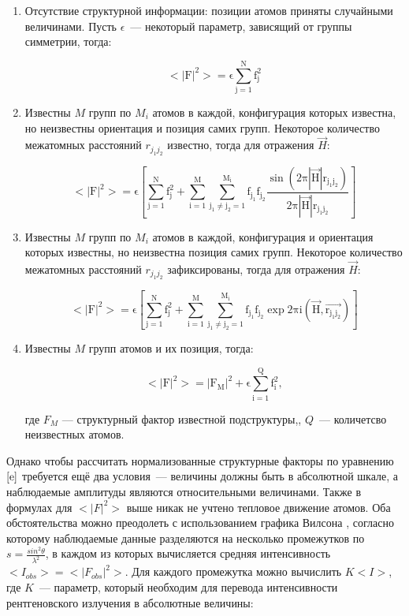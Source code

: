 \begin{enumerate}
	\item Отсутствие структурной информации: позиции атомов приняты случайными величинами. Пусть $\epsilon$~--- некоторый параметр, зависящий от группы симметрии, тогда:
	
	\begin{equation}\label{e1}
		\mathrm{<|F|^2> = \epsilon\sum\limits_{j=1}^N f_j^2}
	\end{equation}
	
	\item Известны $M$ групп по $M_i$ атомов в каждой, конфигурация которых известна, но неизвестны ориентация и позиция самих групп. Некоторое количество межатомных расстояний $r_{j_1j_2}$ известно, тогда для отражения $\overrightarrow{H}$:
	
	\begin{equation}\label{e2}
		\mathrm{<|F|^2> = \epsilon \left[\sum\limits_{j=1}^Nf_j^2 + \sum\limits_{i=1}^M\sum\limits_{j_1\neq j_2=1}^{M_i}f_{j_1}f_{j_2}\frac{\sin(2\pi |\overrightarrow{H}|r_{j_1j_2})}{2\pi |\overrightarrow{H}|r_{j_1j_2}}\right]}
	\end{equation}
	
	\item Известны $M$ групп по $M_i$ атомов в каждой, конфигурация и ориентация которых известны, но неизвестна позиция самих групп. Некоторое количество межатомных расстояний $r_{j_1j_2}$ зафиксированы, тогда для отражения $\overrightarrow{H}$:
	
	\begin{equation}\label{e3}
		\mathrm{<|F|^2> = \epsilon \left[\sum\limits_{j=1}^Nf_j^2 + \sum\limits_{i=1}^M\sum\limits_{j_1\neq j_2=1}^{M_i}f_{j_1}f_{j_2}\exp 2\pi i(\overrightarrow{H},\overrightarrow{r_{j_1j_2}})\right]}
	\end{equation}
	
	\item Известны $M$ групп атомов и их позиция, тогда:
	
	\begin{equation}\label{e4}
		\mathrm{<|F|^2> = |F_M|^2 + \epsilon\sum\limits_{i=1}^Qf_i^2},
	\end{equation}
	
	где $F_M$ --- структурный фактор известной подструктуры,, $Q$~--- количетсво неизвестных атомов.
\end{enumerate}

Однако чтобы рассчитать нормализованные структурные факторы по уравнению $\ref{e}$ требуется ещё два условия~--- величины должны быть в абсолютной шкале, а наблюдаемые амплитуды являются относительными величинами. Также в формулах для $<|F|^2>$ выше никак не учтено тепловое движение атомов. Оба обстоятельства можно преодолеть с использованием графика Вилсона \cite{wilson_determination_1942}, согласно которому наблюдаемые данные разделяются на несколько промежутков по $s = \frac{sin^2 \theta}{\lambda^2}$, в каждом из которых вычисляется средняя интенсивность $<I_{obs}> = <|F_{obs}|^2>$. Для каждого промежутка можно вычислить $K<I>$, где $K$~--- параметр, который необходим для перевода интенсивности рентгеновского излучения в абсолютные величины:

